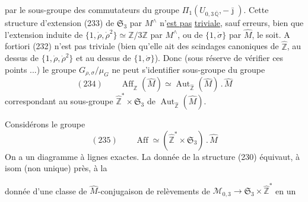 

par le sous-groupe  des commutateurs
du groupe $\Pi_1(U_{0,3\,\overline{\mathbb Q}},-\bar{\jmath})$.
Cette  structure d'extension (233) de $\mathfrak S_3$
par $M^\wedge$ n'\uline{est pas} \uline{triviale}, sauf erreurs,
bien que l'extension induite de
$\{1,\dot\rho,\dot\rho^2\}\simeq\mathbb Z/3\mathbb Z$ par $M^\wedge$,
ou de $\{1,\dot\sigma\}$ par $\widehat M$, le soit.
A fortiori (232) n'est pas triviale (bien qu'elle ait des scindages
canoniques  de $\widehat{\mathbb Z}$, au dessus de
$\{1,\dot\rho,\dot\rho^2\}$ et au dessus de $\{1,\dot\sigma\}$).
Donc (sous réserve de vérifier ces points ...)
le groupe $G_{\rho,\sigma}/\mu_G$ ne peut s'identifier
 sous-groupe du groupe 
\[
(234)\qquad
\boxed{\operatorname{Aff}_{\widehat{\mathbb Z}}(\widehat M)
\simeq\operatorname{Aut}_{\widehat{\mathbb Z}}(\widehat M)\mathbin{.}\widehat M}
\]
correspondant au sous-groupe $\widehat{\mathbb Z}^{*}\times\mathfrak S_3$
de $\operatorname{Aut}_{\widehat{\mathbb Z}}(\widehat M)$.

 Considérons le groupe
\[
(235)\qquad
\operatorname{Aff}\simeq
(\widehat{\mathbb Z}^{*}\times\mathfrak S_3)\mathbin{.}\widehat M
\]
On a un diagramme
à lignes exactes. La donnée de la structure (230) équivaut,
à isom (non unique) près, à la


donnée d'une classe de $\widehat M$-conjugaison de relèvements
de $\mathcal M_{0,3}\longrightarrow\mathfrak S_3\times\widehat{\mathbb Z}^{*}$
en un

